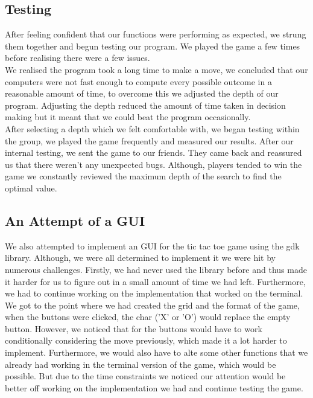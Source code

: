 \documentclass[11pt]{article}
\begin{document}
\subsection{Testing}
After feeling confident that our functions were performing as expected, we strung them together and begun testing our program. We played the game a few times before realising there were a few issues.
\\We realised the program took a long time to make a move, we concluded that our computers were not fast enough to compute every possible outcome in a reasonable amount of time, to overcome this we adjusted the depth of our program. Adjusting the depth reduced the amount of time taken in decision making but it meant that we could beat the program occasionally. 
\\After selecting a depth which we felt comfortable with, we began testing within the group, we played the game frequently and measured our results. After our internal testing, we sent the game to our friends. They came back and reassured us that there weren't any unexpected bugs. Although, players tended to win the game we constantly reviewed the maximum depth of the search to find the optimal value.

\subsection{An Attempt of a GUI}
We also attempted to implement an GUI for the tic tac toe game using the gdk library. Although, we were all determined to implement it we were hit by numerous challenges. Firstly, we had never used the library before and thus made it harder for us to figure out in a small amount of time we had left. Furthermore, we had to continue working on the implementation that worked on the terminal.
\\We got to the point where we had created the grid and the format of the game, when the buttons were clicked, the char ('X' or 'O') would replace the empty button. However, we noticed that for the buttons would have to work conditionally considering the move previously, which made it a lot harder to implement. Furthermore, we would also have to alte some other functions that we already had working in the terminal version of the game, which would be possible. But due to the time constraints we noticed our attention would be better off working on the implementation we had and continue testing the game. 
\end{document}
